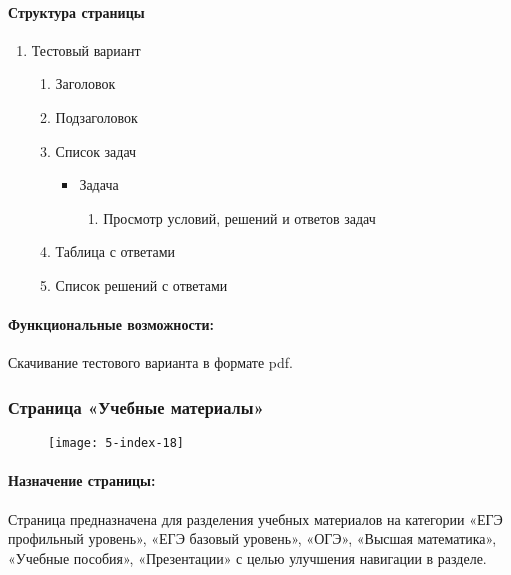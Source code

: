 \paragraph{Структура страницы}
\begin{enumerate}
	\item Тестовый вариант
	\begin{enumerate}
		\item Заголовок
		\item Подзаголовок
		\item Список задач
		\begin{itemize}
			\item Задача
			\begin{enumerate}
				\item Просмотр условий, решений и ответов задач
			\end{enumerate}
		\end{itemize}
		\item Таблица с ответами
		\item Список решений с ответами
	\end{enumerate}
\end{enumerate}

\paragraph{Функциональные возможности:} Скачивание тестового варианта в формате pdf.


\subsubsection{Страница «Учебные материалы»}
\begin{figure}[H]
\texttt{[image: 5-index-18]}
\end{figure}

\paragraph{Назначение страницы:} Страница предназначена для разделения учебных материалов на категории «ЕГЭ профильный уровень», «ЕГЭ базовый уровень», «ОГЭ», «Высшая математика», «Учебные пособия», «Презентации» с целью улучшения навигации в разделе.

